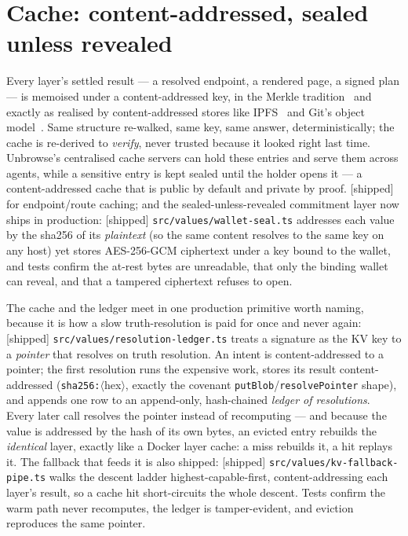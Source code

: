 \documentclass[11pt]{article}
\newcommand{\impl}{\textcolor{green!55!black}{\small[shipped]}}
\begin{document}
\section{Cache: content-addressed, sealed unless revealed}

Every layer's settled result --- a resolved endpoint, a rendered page, a signed
plan --- is memoised under a content-addressed key, in the Merkle
tradition~\cite{merkle} and exactly as realised by content-addressed stores like
IPFS~\cite{ipfs} and Git's object model~\cite{gitobjects}. Same structure
re-walked, same key, same answer, deterministically; the cache is re-derived to
\emph{verify}, never trusted because it looked right last time. Unbrowse's
centralised cache servers can hold these entries and serve them across agents,
while a sensitive entry is kept sealed until the holder opens it --- a
content-addressed cache that is public by default and private by proof. \impl{} for
endpoint/route caching; and the sealed-unless-revealed commitment layer now ships in
production: \impl{} \texttt{src/values/wallet-seal.ts} addresses each value by the
sha256 of its \emph{plaintext} (so the same content resolves to the same key on any
host) yet stores AES-256-GCM ciphertext under a key bound to the wallet, and tests
confirm the at-rest bytes are unreadable, that only the binding wallet can reveal, and
that a tampered ciphertext refuses to open.

The cache and the ledger meet in one production primitive worth naming, because it is
how a slow truth-resolution is paid for once and never again: \impl{}
\texttt{src/values/resolution-ledger.ts} treats a signature as the KV key to a
\emph{pointer} that resolves on truth resolution. An intent is content-addressed to a
pointer; the first resolution runs the expensive work, stores its result content-addressed
(\texttt{sha256:}$\langle$hex$\rangle$, exactly the covenant \texttt{putBlob}/\texttt{resolvePointer}
shape), and appends one row to an append-only, hash-chained \emph{ledger of resolutions}.
Every later call resolves the pointer instead of recomputing --- and because the value is
addressed by the hash of its own bytes, an evicted entry rebuilds the \emph{identical}
layer, exactly like a Docker layer cache: a miss rebuilds it, a hit replays it. The
fallback that feeds it is also shipped: \impl{} \texttt{src/values/kv-fallback-pipe.ts}
walks the descent ladder highest-capable-first, content-addressing each layer's result,
so a cache hit short-circuits the whole descent. Tests confirm the warm path never
recomputes, the ledger is tamper-evident, and eviction reproduces the same pointer.
\end{document}
